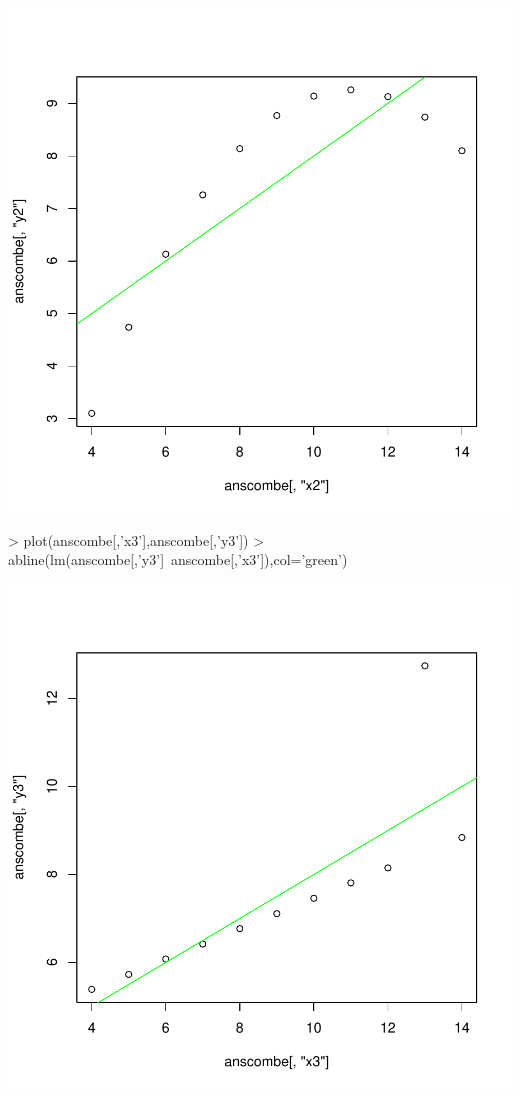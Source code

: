 \includegraphics{sw11_5-002}
\begin{Schunk}
\begin{Sinput}
> plot(anscombe[,'x3'],anscombe[,'y3'])
> abline(lm(anscombe[,'y3']~anscombe[,'x3']),col='green')
\end{Sinput}
\end{Schunk}
\includegraphics{sw11_5-003}
